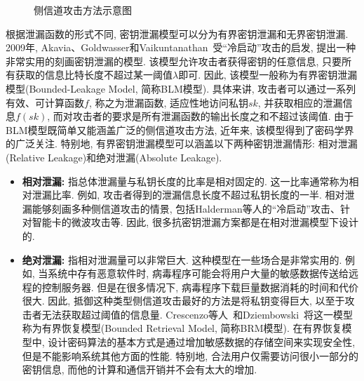 \begin{figure}[htp!]
\begin{center}
\end{center}
\caption{侧信道攻击方法示意图}\label{fig:ch5-SCA}
\end{figure}

根据泄漏函数的形式不同, 密钥泄漏模型可以分为有界密钥泄漏和无界密钥泄漏. 2009年, Akavia、Goldwasser和Vaikuntanathan~\cite{AGV-TCC-2009}受``冷启动''攻击的启发, 提出一种非常实用的刻画密钥泄漏的模型. 该模型允许攻击者获得密钥的任意信息, 只要所有获取的信息比特长度不超过某一阈值$\lambda$即可. 因此, 该模型一般称为有界密钥泄漏模型(Bounded-Leakage Model, 简称BLM模型). 具体来讲, 攻击者可以通过一系列有效、可计算函数$f$, 称之为泄漏函数, 适应性地访问私钥$sk$, 并获取相应的泄漏信息$f(sk)$, 而对攻击者的要求是所有泄漏函数的输出长度之和不超过该阈值. 由于BLM模型既简单又能涵盖广泛的侧信道攻击方法, 近年来, 该模型得到了密码学界的广泛关注. 特别地, 有界密钥泄漏模型可以涵盖以下两种密钥泄漏情形: 相对泄漏(Relative Leakage)和绝对泄漏(Absolute Leakage).
\begin{itemize}
\item\textbf{相对泄漏:} 指总体泄漏量与私钥长度的比率是相对固定的. 这一比率通常称为相对泄漏比率. 例如, 攻击者得到的泄漏信息长度不超过私钥长度的一半. 相对泄漏能够刻画多种侧信道攻击的情景, 包括Halderman等人的``冷启动''攻击、针对智能卡的微波攻击等. 因此, 很多抗密钥泄漏方案都是在相对泄漏模型下设计的.
\item\textbf{绝对泄漏:} 指相对泄漏量可以非常巨大. 这种模型在一些场合是非常实用的. 例如, 当系统中存有恶意软件时, 病毒程序可能会将用户大量的敏感数据传送给远程的控制服务器. 但是在很多情况下, 病毒程序下载巨量数据消耗的时间和代价很大. 因此, 抵御这种类型侧信道攻击最好的方法是将私钥变得巨大, 以至于攻击者无法获取超过阈值的信息量. Crescenzo等人~\cite{CLW-TCC-2006}和Dziembowski~\cite{Stefan-TCC-2006}将这一模型称为有界恢复模型(Bounded Retrieval Model, 简称BRM模型). 在有界恢复模型中, 设计密码算法的基本方式是通过增加敏感数据的存储空间来实现安全性, 但是不能影响系统其他方面的性能. 特别地, 合法用户仅需要访问很小一部分的密钥信息, 而他的计算和通信开销并不会有太大的增加.
\end{itemize}

